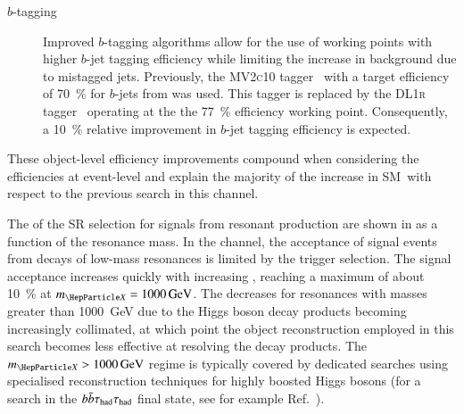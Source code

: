 \begin{description}
\item[$b$-tagging] Improved $b$-tagging algorithms allow for the use of working
  points with higher $b$-jet tagging efficiency while limiting the increase in
  background due to mistagged jets. Previously, the \textsc{MV2c10}
  tagger~\cite{ATL-PHYS-PUB-2016-012} with a target efficiency of
  \SI{70}{\percent} for $b$-jets from \ttbar was used. This tagger is replaced
  by the \textsc{DL1r} tagger~\cite{FTAG-2019-07} operating at the the
  \SI{77}{\percent} efficiency working point. Consequently, a \SI{10}{\percent}
  relative improvement in $b$-jet tagging efficiency is expected.


\end{description}
These object-level efficiency improvements compound when considering the
efficiencies at event-level
and explain the majority of the increase in SM~\HH \AccTimesEff with respect to
the previous search in this channel.

The \AccTimesEff of the SR selection for signals from resonant \HH production
are shown in  as a function of the
resonance mass. In the \hadhad channel, the acceptance of signal events from
decays of low-mass resonances is limited by the trigger selection. The signal
acceptance increases quickly with increasing \mX, reaching a maximum of about
\SI{10}{\percent} at $\mX = \SI{1000}{\GeV}$. The \AccTimesEff decreases for
resonances with masses greater than \SI{1000}{\GeV} due to the Higgs boson decay
products becoming increasingly collimated, at which point the object
reconstruction employed in this search becomes less effective at resolving the
decay products. The $\mX > \SI{1000}{\GeV}$ regime is typically covered by
dedicated searches using specialised reconstruction techniques for highly
boosted Higgs bosons (for a search in the $b\bar{b}\tau_{\text{had}}\tau_{\text{had}}$ final state, see for
example Ref.~\cite{HDBS-2019-22}).

